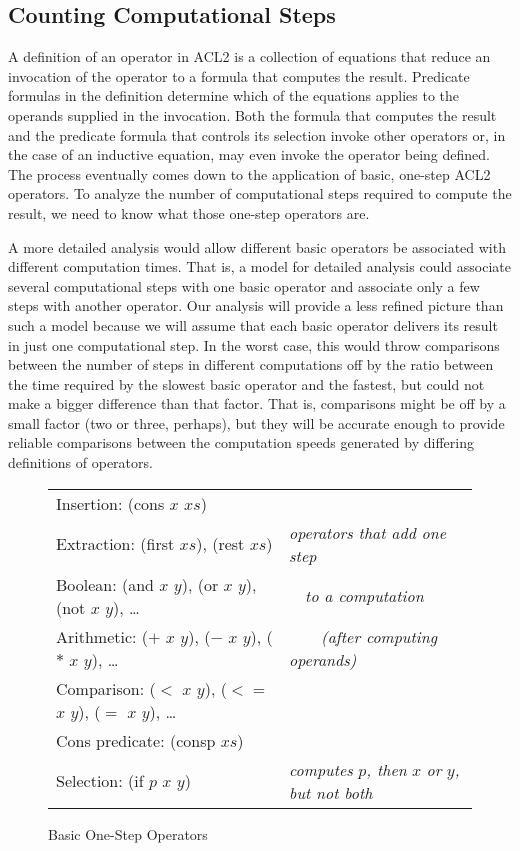 \subsection{Counting Computational Steps}
\label{subsec:counting-computational-steps}

A definition of an operator in ACL2
is a collection of equations that
reduce an invocation of the operator
to a formula that computes the result.
Predicate formulas in the definition determine
which of the equations applies to
the operands supplied in the invocation.
Both the formula that computes the result and
the predicate formula that controls
its selection invoke other operators
or, in the case of an inductive equation,
may even invoke the operator being defined.
The process eventually comes down to the
application of basic, one-step ACL2 operators.
To analyze the number of computational steps
required to compute the result,
we need to know what those one-step operators are.

A more detailed analysis would allow different
basic operators be associated with different computation times.
That is, a model for detailed analysis could associate
several computational steps with one basic operator
and associate only a few steps with another operator.
Our analysis will provide a less refined picture than such
a model because we will assume that each basic operator
delivers its result in just one computational step.
In the worst case, this would throw comparisons between
the number of steps in different computations off
by the ratio between the time required by the slowest basic
operator and the fastest, but could not make a bigger
difference than that factor. That is, comparisons
might be off by a small factor (two or three, perhaps),
but they will be accurate enough to provide
reliable comparisons between the computation speeds
generated by differing definitions of operators.

\begin{figure}
\begin{center}
\begin{tabular}{ll}
Insertion: (cons $x$ $xs$)                                       & \\
Extraction: (first $xs$), (rest $xs$)                            & \emph{operators that add one step} \\
Boolean: (and $x$ $y$), (or $x$ $y$), (not $x$ $y$), \dots       & ~~\emph{to a computation}            \\
Arithmetic: ($+$ $x$ $y$), ($-$ $x$ $y$), ($*$ $x$ $y$), \dots   & ~~~~\emph{(after computing operands)} \\
Comparison: ($<$ $x$ $y$), ($<=$ $x$ $y$), ($=$ $x$ $y$), \dots  & \\
Cons predicate: (consp $xs$)                                     & \\
Selection: (if $p$ $x$ $y$)                                      & \emph{computes} $p$\emph{, then} $x$ \emph{or} $y$\emph{, but not both}
\end{tabular}
\end{center}
\caption{Basic One-Step Operators}
\label{fig:basic-one-step-ops}
\end{figure}


